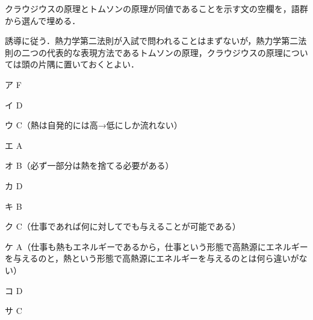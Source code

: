 \begin{multicols}{2}
\begin{kaitou}
\end{kaitou}
\begin{saikei}
クラウジウスの原理とトムソンの原理が同値であることを示す文の空欄を，語群から選んで埋める．
\end{saikei}
\begin{sisin}
誘導に従う．熱力学第二法則が入試で問われることはまずないが，熱力学第二法則の二つの代表的な表現方法であるトムソンの原理，クラウジウスの原理については頭の片隅に置いておくとよい．
\end{sisin}
\begin{kaitou}
\begin{list}{}{%
  \setlength{\leftmargin}{3zw}\setlength{\labelwidth}{1.5zw}%
  \setlength{\labelsep}{1zw}\setlength{\itemsep}{0pt}%
  \setlength{\parsep}{0pt}\setlength{\topsep}{2pt}\setlength{\partopsep}{0pt}}
\item[ア] F
\item[イ] D
\item[ウ] C（熱は自発的には高→低にしか流れない）
\item[エ] A
\item[オ] B（必ず一部分は熱を捨てる必要がある）
\item[カ] D
\item[キ] B
\item[ク] C（仕事であれば何に対してでも与えることが可能である）
\item[ケ] A（仕事も熱もエネルギーであるから，仕事という形態で高熱源にエネルギーを与えるのと，熱という形態で高熱源にエネルギーを与えるのとは何ら違いがない）
\item[コ] D
\item[サ] C
\end{list}

\end{kaitou}
\end{multicols}
